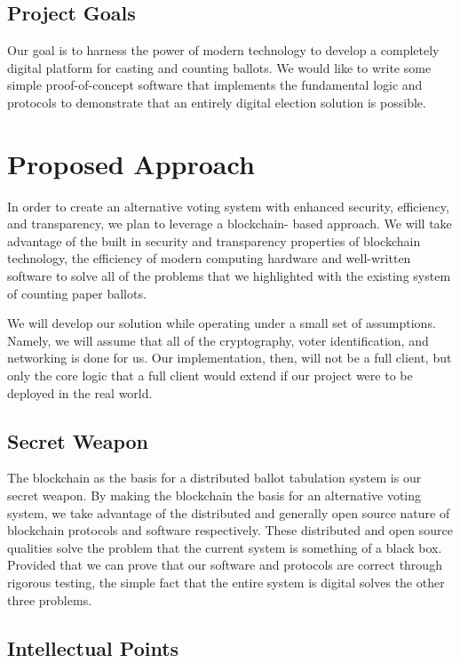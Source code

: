 \documentclass[conference]{IEEEtran}
\begin{document}
\subsection{Project Goals}

Our goal is to harness the power of modern technology to develop a
completely digital platform for casting and counting ballots. We would like
to write some simple proof-of-concept software that implements the
fundamental logic and protocols to demonstrate that an entirely digital
election solution is possible.

\section{Proposed Approach}
In order to create an alternative voting system with enhanced security, efficiency, and transparency, we plan to leverage a blockchain-
based approach. We will take advantage of the built in security and
transparency properties of blockchain technology, the efficiency of modern
computing hardware and well-written software to solve all
of the problems that we highlighted with the existing system of counting
paper ballots.

We will develop our solution while operating under a small set of
assumptions. Namely, we will assume that all of the cryptography, voter identification, and networking is done for us. Our implementation,
then, will not be a full client, but only the core logic that a full client
would extend if our project were to be deployed in the real world.

\subsection{Secret Weapon}

The blockchain as the basis for a distributed ballot tabulation system is our secret weapon. By making the blockchain the basis for an alternative voting system, we take advantage of the distributed and generally open source nature of blockchain protocols and software respectively. These distributed and open source qualities solve the problem that the current system is something of a black box. Provided that we can prove that our software and protocols are correct through rigorous testing, the simple fact that the entire system is digital solves the other three problems.

\subsection{Intellectual Points}
\end{document}
